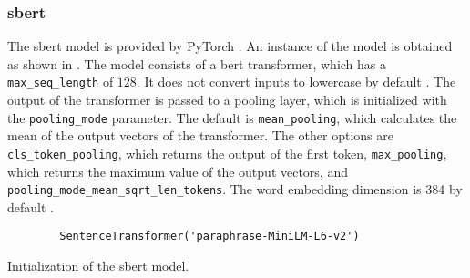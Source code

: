 \subsubsection*{\ac{sbert}}\label{subsubsec:impl-sbert}

The \ac{sbert} model is provided by PyTorch \cite{HfsentTrans2019}.
An instance of the model is obtained as shown in .
The model consists of a \ac{bert} transformer, which has a \texttt{max\_seq\_length} of $128$. 
It does not convert inputs to lowercase by default \cite{sbert-dev}.
The output of the transformer is passed to a pooling layer, which is initialized with the \texttt{pooling\_mode} parameter.
The default is \texttt{mean\_pooling}, which calculates the mean of the output vectors of the transformer.
The other options are \texttt{cls\_token\_pooling}, which returns the output of the first token, 
\texttt{max\_pooling}, which returns the maximum value of the output vectors,
and \texttt{pooling\_mode\_mean\_sqrt\_len\_tokens}.
The word embedding dimension is 384 by default \cite{sbert-dev}.

\begin{listing}[htp]
    \begin{verbatim}
        SentenceTransformer('paraphrase-MiniLM-L6-v2')
    \end{verbatim}
    \caption[Initialization of the \ac{sbert} model]{Initialization of the \ac{sbert} model.
    }
    \label{lst:impl-sbert}
\end{listing}